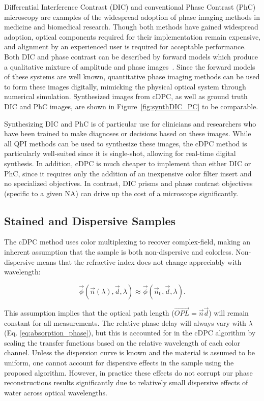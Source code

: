 Differential Interference Contrast (DIC) and conventional Phase Contrast (PhC) microscopy are examples of the widespread adoption of phase imaging methods in medicine and biomedical research. Though both methods have gained widespread adoption, optical components required for their implementation remain expensive, and alignment by an experienced user is required for acceptable performance. Both DIC and phase contrast can be described by forward models which produce a qualitative mixture of amplitude and phase images~\cite{zernike1942phase, smithDIC}. Since the forward models of these systems are well known, quantitative phase imaging methods can be used to form these images digitally, mimicking the physical optical system through numerical simulation. Synthesized images from cDPC, as well as ground truth DIC and PhC images, are shown in Figure~\ref{fig:synthDIC_PC} to be comparable.

Synthesizing DIC and PhC is of particular use for clinicians and researchers who have been trained to make diagnoses or decisions based on these images. While all QPI methods can be used to synthesize these images, the cDPC method is particularly well-suited since it is single-shot, allowing for real-time digital synthesis. In addition, cDPC is much cheaper to implement than either DIC or PhC, since it requires only the addition of an inexpensive color filter insert and no specialized objectives. In contrast, DIC prisms and phase contrast objectives (specific to a given NA) can drive up the cost of a microscope significantly.

\subsection{Stained and Dispersive Samples}
The cDPC method uses color multiplexing to recover complex-field, making an inherent assumption that the sample is both non-dispersive and colorless. Non-dispersive means that the refractive index does not change appreciably with wavelength:

\begin{equation} \label{Eq:nonDispersive}
\vec{\phi}(\vec{n}(\lambda),\vec{d},\lambda) \approx \vec{\phi}(\vec{n}_0,\vec{d},\lambda).
\end{equation}

\noindent This assumption implies that the optical path length ($\vec{OPL} = \vec{n}\vec{d}$) will remain constant for all measurements. The relative phase delay will always vary with $\lambda$ (Eq. \ref{eq:absorption_phase}), but this is accounted for in the cDPC algorithm by scaling the transfer functions based on the relative wavelength of each color channel. Unless the dispersion curve is known and the material is assumed to be uniform, one cannot account for dispersive effects in the sample using the proposed algorithm. However, in practice these effects do not corrupt our phase reconstructions results significantly due to relatively small dispersive effects of water across optical wavelengths.

